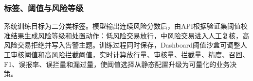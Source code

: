 \subsubsection{标签、阈值与风险等级}

系统训练目标为二分类标签。模型输出连续风险分数后，由API根据验证集阈值校准结果生成风险等级和处置动作：低风险交易放行，中风险交易进入人工复核，高风险交易拒绝并写入告警主题。训练过程同时保存，Dashboard阈值沙盒可调整人工审核阈值和高风险拦截阈值，实时计算放行量、审核量、拦截量、精度、召回、F1、误报率、误拦量和漏过量，使阈值选择从静态配置升级为可量化的业务决策。
